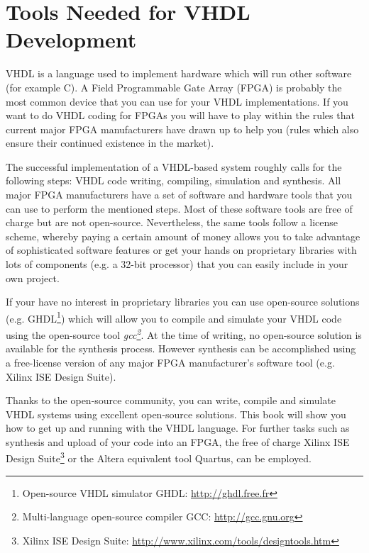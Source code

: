 \section{Tools Needed for VHDL Development}
VHDL is a language used to implement hardware which will run other software (for example C). A Field Programmable Gate Array (FPGA) is probably the most common device that you can use for your VHDL implementations. If you want to do VHDL coding for FPGAs you will have to play within the rules that current major FPGA manufacturers have drawn up to help you (rules which also ensure their continued existence in the market).

The successful implementation of a VHDL-based system roughly calls for the following steps: VHDL code writing, compiling, simulation and synthesis. All major FPGA manufacturers have a set of software and hardware tools that you can use to perform the mentioned steps. Most of these software tools are free of charge but are not open-source. Nevertheless, the same tools follow a license scheme, whereby paying a certain amount of money allows you to take advantage of sophisticated software features or get your hands on proprietary libraries with lots of components (e.g. a 32-bit processor) that you can easily include in your own project. 

If your have no interest in proprietary libraries you can use open-source solutions (e.g. GHDL\footnote{Open-source VHDL simulator GHDL: {\footnotesize\url{http://ghdl.free.fr}}}) which will allow you to compile and simulate your VHDL code using the open-source tool \textit{gcc\footnote{Multi-language open-source compiler GCC: {\footnotesize\url{http://gcc.gnu.org}}}}. At the time of writing, no open-source solution is available for the synthesis process. However synthesis can be accomplished using a free-license version of any major FPGA manufacturer's software tool (e.g. Xilinx ISE Design Suite).

Thanks to the open-source community, you can write, compile and simulate VHDL systems using excellent open-source solutions. This book will show you how to get up and running with the VHDL language. For further tasks such as synthesis and upload of your code into an FPGA, the free of charge Xilinx ISE Design Suite\footnote{Xilinx ISE Design Suite: {\footnotesize\url{http://www.xilinx.com/tools/designtools.htm}}} or the Altera equivalent tool Quartus, can be employed.

 

